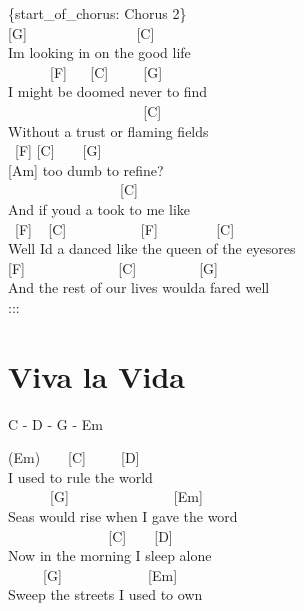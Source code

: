 \documentclass[
  letterpaper,
  twoside=false]{scrbook}
\begin{document}
\{start\_of\_chorus: Chorus 2\}\\
{[}G{]} ~ ~ ~ ~ ~ ~ ~ ~ ~ {[}C{]}\\
I\textquotesingle m looking in on the good life\\
\hspace*{0.333em} ~ ~ ~ ~{[}F{]} ~ ~{[}C{]} ~ ~ ~{[}G{]}\\
I might be doomed never to find\\
\hspace*{0.333em} ~ ~ ~ ~ ~ ~ ~ ~ ~ ~ ~ ~{[}C{]}\\
Without a trust or flaming fields\\
\hspace*{0.333em} ~{[}F{]} {[}C{]} ~ ~ {[}G{]}\\
{[}Am{]} too dumb to refine?\\
\hspace*{0.333em} ~ ~ ~ ~ ~ ~ ~ ~ ~ ~{[}C{]}\\
And if you\textquotesingle d a took to me like\\
\hspace*{0.333em} ~{[}F{]} ~ {[}C{]} ~ ~ ~ ~ ~ ~ {[}F{]} ~ ~ ~ ~
~{[}C{]}\\
Well I\textquotesingle d a danced like the queen of the eyesores\\
{[}F{]} ~ ~ ~ ~ ~ ~ ~ ~{[}C{]} ~ ~ ~ ~ ~ {[}G{]}\\
And the rest of our lives would\textquotesingle a fared well\\
:::

\hypertarget{viva-la-vida}{%
\chapter{Viva la Vida}\label{viva-la-vida}}

C - D - G - Em

(Em) ~ ~ {[}C{]} ~ ~ ~{[}D{]}\\
I used to rule the world\\
\hspace*{0.333em} ~ ~ ~ ~{[}G{]} ~ ~ ~ ~ ~ ~ ~ ~ ~{[}Em{]}\\
Seas would rise when I gave the word\\
\hspace*{0.333em} ~ ~ ~ ~ ~ ~ ~ ~ ~{[}C{]} ~ ~ {[}D{]}\\
Now in the morning I sleep alone\\
\hspace*{0.333em} ~ ~ ~ {[}G{]} ~ ~ ~ ~ ~ ~ ~ {[}Em{]}\\
Sweep the streets I used to own
\end{document}
